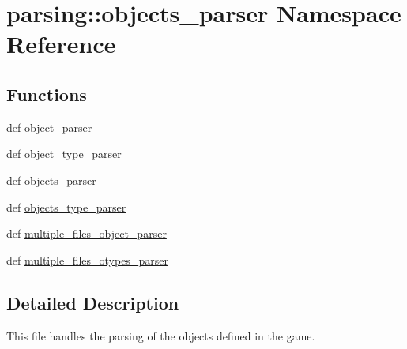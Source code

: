 \hypertarget{namespaceparsing_1_1objects__parser}{\section{parsing\-:\-:objects\-\_\-parser \-Namespace \-Reference}
\label{namespaceparsing_1_1objects__parser}
}
\subsection*{\-Functions}
\begin{DoxyCompactItemize}
\item 
def \hyperlink{namespaceparsing_1_1objects__parser_a61c009517edb095eee1a5f0871d7e004}{object\-\_\-parser}
\item 
def \hyperlink{namespaceparsing_1_1objects__parser_acf6fa2bd576f3f360f59222a6b81481f}{object\-\_\-type\-\_\-parser}
\item 
def \hyperlink{namespaceparsing_1_1objects__parser_aca044797e2c65609c59f7727bcdc315e}{objects\-\_\-parser}
\item 
def \hyperlink{namespaceparsing_1_1objects__parser_aefd640bf2ec69fb4d3eb9625ff09823e}{objects\-\_\-type\-\_\-parser}
\item 
def \hyperlink{namespaceparsing_1_1objects__parser_a1c80ac845e5f4c845649015e1ae72fd7}{multiple\-\_\-files\-\_\-object\-\_\-parser}
\item 
def \hyperlink{namespaceparsing_1_1objects__parser_ae5df291702ae7d4143fd788a9515d1cb}{multiple\-\_\-files\-\_\-otypes\-\_\-parser}
\end{DoxyCompactItemize}


\subsection{\-Detailed \-Description}
\begin{DoxyVerb}
This file handles the parsing of the objects defined in the game.
\end{DoxyVerb}
 

